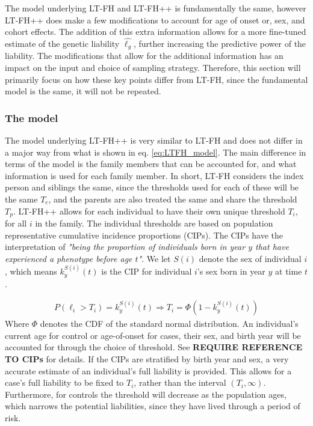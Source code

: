 The model underlying LT-FH and LT-FH++ is fundamentally the same, however LT-FH++ does make a few modifications to account for age of onset or, sex, and cohort effects. The addition of this extra information allows for a more fine-tuned estimate of the genetic liability $ \hat{\ell_g} $, further increasing the predictive power of the liability. The modifications that allow for the additional information has an impact on the input and choice of sampling strategy. Therefore, this section will primarily focus on how these key points differ from LT-FH, since the fundamental model is the same, it will not be repeated. 

\subsubsection{The model}

The model underlying LT-FH++ is very similar to LT-FH and does not differ in a major way from what is shown in eq. \ref{eq:LTFH_model}. The main difference in terms of the model is the family members that can be accounted for, and what information is used for each family member. In short, LT-FH considers the index person and siblings the same, since the thresholds used for each of these will be the same $ T_c $, and the parents are also treated the same and share the threshold $ T_p $. LT-FH++ allows for each individual to have their own unique threshold $ T_i $, for all $ i $ in the family. The individual thresholds are based on population representative cumulative incidence proportions (CIPs). The CIPs have the interpretation of \textit{"being the proportion of individuals born in year $ y $ that have experienced a phenotype before age $ t $"}. We let $ S(i) $ denote the sex of individual $ i $, which means $ k_{y}^{S(i)}(t) $ is the CIP for individual $ i $'s sex born in year $ y $ at time $ t $.

\begin{align*}
P\left( \ell_i > T_i \right) = k_{y}^{S(i)}(t) \Rightarrow T_i = \Phi \left(1 - k_{y}^{S(i)}(t) \right)
\end{align*}
Where $ \Phi $ denotes the CDF of the standard normal distribution. An individual's current age for control or age-of-onset for cases, their sex, and birth year will be accounted for through the choice of threshold. See \textbf{REQUIRE REFERENCE TO CIPs} for details. If the CIPs are stratified by birth year and sex, a very accurate estimate of an individual's full liability is provided. This allows for a case's full liability to be fixed to $ T_i $, rather than the interval $ (T_i, \infty) $. Furthermore, for controls the threshold will decrease as the population ages, which narrows the potential liabilities, since they have lived through a period of risk.

